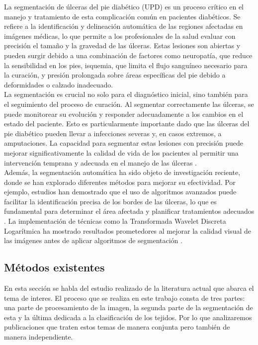 \documentclass[12pt]{article}
\begin{document}
		
		La segmentación de úlceras del pie diabético (UPD) es un proceso crítico en el manejo y tratamiento de esta complicación común en pacientes diabéticos. Se refiere a la identificación y delineación automática de las regiones afectadas en imágenes médicas, lo que permite a los profesionales de la salud evaluar con precisión el tamaño y la gravedad de las úlceras. Estas lesiones son abiertas y pueden surgir debido a una combinación de factores como neuropatía, que reduce la sensibilidad en los pies, isquemia, que limita el flujo sanguíneo necesario para la curación, y presión prolongada sobre áreas específicas del pie debido a deformidades o calzado inadecuado.
		\\
		
		La segmentación es crucial no solo para el diagnóstico inicial, sino también para el seguimiento del proceso de curación. Al segmentar correctamente las úlceras, se puede monitorear su evolución y responder adecuadamente a los cambios en el estado del paciente. Esto es particularmente importante dado que las úlceras del pie diabético pueden llevar a infecciones severas y, en casos extremos, a amputaciones. La capacidad para segmentar estas lesiones con precisión puede mejorar significativamente la calidad de vida de los pacientes al permitir una intervención temprana y adecuada en el manejo de las úlceras \cite{Pereira2018}.
		\\
		
		Además, la segmentación automática ha sido objeto de investigación reciente, donde se han explorado diferentes métodos para mejorar su efectividad. Por ejemplo, estudios han demostrado que el uso de algoritmos avanzados puede facilitar la identificación precisa de los bordes de las úlceras, lo que es fundamental para determinar el área afectada y planificar tratamientos adecuados \cite{Gomez2019}. La implementación de técnicas como la Transformada Wavelet Discreta Logarítmica ha mostrado resultados prometedores al mejorar la calidad visual de las imágenes antes de aplicar algoritmos de segmentación \cite{Heber2019}.
		
		\subsection{M\'etodos existentes}
	En esta secci\'on se habla del estudio realizado de la literatura actual que abarca el tema de interes.
	El proceso que se realiza en este trabajo consta de tres partes: una parte de procesamiento de la imagen, la segunda parte de la segmentaci\'on de esta y la \'ultima dedicada a la clasificaci\'on de los tejidos. Por lo que analizaremos publicaciones que traten estos temas de manera conjunta pero tambi\'en de manera independiente.
	\\
	
\end{document}
